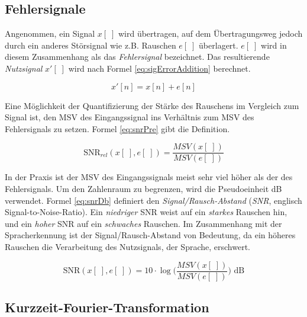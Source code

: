
\subsection{Fehlersignale}


Angenommen, ein Signal $x[\;]$ wird übertragen, auf dem Übertragungsweg jedoch durch ein anderes Störsignal wie z.B. Rauschen $e[\;]$ überlagert. $e[\;]$ wird in diesem Zusammenhang als das \emph{Fehlersignal} bezeichnet. Das resultierende \emph{Nutzsignal} $x'[\;]$ wird nach Formel \ref{eq:sigErrorAddition} berechnet. 

\begin{equation}
x'[n] = x[n] + e[n]
\label{eq:sigErrorAddition}
\end{equation}

Eine Möglichkeit der Quantifizierung der Stärke des Rauschens im Vergleich zum Signal ist, den MSV des Eingangssignal ins Verhältnis zum MSV des Fehlersignals zu setzen. Formel \ref{eq:snrPre} gibt die Definition.


\begin{equation}
\text{SNR}_{rel}(x[\;],e[\;]) = \frac{MSV(x[\;])}{MSV(e[\;])}
\label{eq:snrPre}
\end{equation}

In der Praxis ist der MSV des Eingangssignals meist sehr viel höher als der des Fehlersignals. Um den Zahlenraum zu begrenzen, wird die Pseudoeinheit dB verwendet. Formel \ref{eq:snrDb} definiert den \emph{Signal/Rausch-Abstand} (\emph{SNR}, englisch Signal-to-Noise-Ratio). Ein \emph{niedriger} SNR weist auf ein \emph{starkes} Rauschen hin, und ein \emph{hoher} SNR auf ein \emph{schwaches} Rauschen. Im Zusammenhang mit der Spracherkennung ist der Signal/Rausch-Abstand von Bedeutung, da ein höheres Rauschen die Verarbeitung des Nutzsignals, der Sprache, erschwert.

\begin{equation}
\text{SNR}(x[\;],e[\;]) = 10 \cdot  \log \Big(\frac{MSV(x[\;])}{MSV(e[\;])} \Big) \text{ dB}
\label{eq:snrDb}
\end{equation}

\subsection{Kurzzeit-Fourier-Transformation}
\label{sec:stft}

